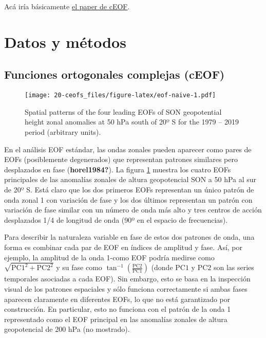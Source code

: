 \documentclass[12pt,oneside]{reedthesis}
\begin{document}
Acá iría básicamente \href{https://github.com/eliocamp/shceof}{el paper de cEOF}.

\hypertarget{datos-y-muxe9todos}{%
\section{Datos y métodos}\label{datos-y-muxe9todos}}

\hypertarget{funciones-ortogonales-complejas-ceof}{%
\subsection{Funciones ortogonales complejas (cEOF)}\label{funciones-ortogonales-complejas-ceof}}


\begin{figure}
\centering
\texttt{[image: 20-ceofs\_files/figure-latex/eof-naive-1.pdf]}
\caption{\label{fig:eof-naive}Spatial patterns of the four leading EOFs of SON geopotential height zonal anomalies at 50 hPa south of 20º S for the 1979 -- 2019 period (arbitrary units).}
\end{figure}
En el análisis EOF estándar, las ondas zonales pueden aparecer como pares de EOFs (posiblemente degenerados) que representan patrones similares pero desplazados en fase (\textbf{horel1984?}).
La figura \ref{fig:eof-naive} muestra los cuatro EOFs principales de las anomalías zonales de altura geopotencial SON a 50 hPa al sur de 20º S.
Está claro que los dos primeros EOFs representan un único patrón de onda zonal 1 con variación de fase y los dos últimos representan un patrón con variación de fase similar con un número de onda más alto y tres centros de acción desplazados 1/4 de longitud de onda (90º en el espacio de frecuencias).

Para describir la naturaleza variable en fase de estos dos patrones de onda, una forma es combinar cada par de EOF en índices de amplitud y fase.
Así, por ejemplo, la amplitud de la onda 1-como EOF podría medirse como \(\sqrt{\mathrm{PC1}^2 + \mathrm{PC2}^2}\) y su fase como \(\tan^{-1} \left ( \frac{\mathrm{PC2}}{\mathrm{PC1}} \right )\) (donde \(\mathrm{PC1}\) y \(\mathrm{PC2}\) son las series temporales asociadas a cada EOF).
Sin embargo, esto se basa en la inspección visual de los patrones espaciales y sólo funciona correctamente si ambas fases aparecen claramente en diferentes EOFs, lo que no está garantizado por construcción.
En particular, esto no funciona con el patrón de la onda 1 representado como el EOF principal en las anomalías zonales de altura geopotencial de 200 hPa (no mostrado).
\end{document}
